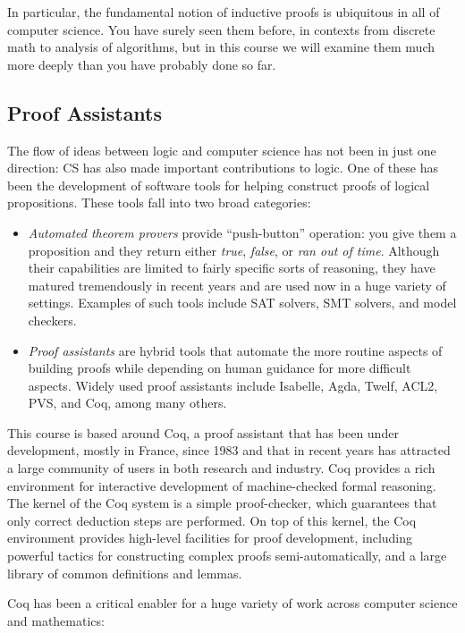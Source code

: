 In particular, the fundamental notion of inductive proofs is ubiquitous
in all of computer science. You have surely seen them before, in
contexts from discrete math to analysis of algorithms, but in this
course we will examine them much more deeply than you have probably done
so far.

\subsection{Proof Assistants}\label{proof-assistants}

The flow of ideas between logic and computer science has not been in
just one direction: CS has also made important contributions to logic.
One of these has been the development of software tools for helping
construct proofs of logical propositions. These tools fall into two
broad categories:

\begin{itemize}
\item
  \emph{Automated theorem provers} provide ``push-button'' operation:
  you give them a proposition and they return either \emph{true},
  \emph{false}, or \emph{ran out of time}. Although their capabilities
  are limited to fairly specific sorts of reasoning, they have matured
  tremendously in recent years and are used now in a huge variety of
  settings. Examples of such tools include SAT solvers, SMT solvers, and
  model checkers.
\item
  \emph{Proof assistants} are hybrid tools that automate the more
  routine aspects of building proofs while depending on human guidance
  for more difficult aspects. Widely used proof assistants include
  Isabelle, Agda, Twelf, ACL2, PVS, and Coq, among many others.
\end{itemize}

This course is based around Coq, a proof assistant that has been under
development, mostly in France, since 1983 and that in recent years has
attracted a large community of users in both research and industry. Coq
provides a rich environment for interactive development of
machine-checked formal reasoning. The kernel of the Coq system is a
simple proof-checker, which guarantees that only correct deduction steps
are performed. On top of this kernel, the Coq environment provides
high-level facilities for proof development, including powerful tactics
for constructing complex proofs semi-automatically, and a large library
of common definitions and lemmas.

Coq has been a critical enabler for a huge variety of work across
computer science and mathematics:


